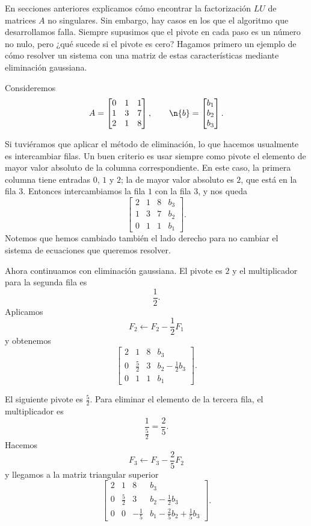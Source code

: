 En secciones anteriores explicamos cómo encontrar la factorización $LU$ de matrices $A$ no singulares. Sin embargo, hay casos en los que el algoritmo que desarrollamos falla. Siempre supusimos que el pivote en cada paso es un número no nulo, pero ¿qué sucede si el pivote es cero? Hagamos primero un ejemplo de cómo resolver un sistema con una matriz de estas características mediante eliminación gaussiana.

Consideremos
\[
A = \begin{bmatrix}
0 & 1 & 1 \\
1 & 3 & 7 \\
2 & 1 & 8
\end{bmatrix}, \qquad
\n{b} = \begin{bmatrix} b_1 \\ b_2 \\ b_3 \end{bmatrix}.
\]

Si tuviéramos que aplicar el método de eliminación, lo que hacemos usualmente es intercambiar filas. Un buen criterio es usar siempre como pivote el elemento de mayor valor absoluto de la columna correspondiente. En este caso, la primera columna tiene entradas $0$, $1$ y $2$; la de mayor valor absoluto es $2$, que está en la fila $3$. Entonces intercambiamos la fila $1$ con la fila $3$, y nos queda
\[
\left[\begin{array}{ccc|c}
2 & 1 & 8 & b_3 \\
1 & 3 & 7 & b_2 \\
0 & 1 & 1 & b_1
\end{array}\right].
\]
Notemos que hemos cambiado también el lado derecho para no cambiar el sistema de ecuaciones que queremos resolver.

Ahora continuamos con eliminación gaussiana. El pivote es $2$ y el multiplicador para la segunda fila es
\[
\frac{1}{2}.
\]
Aplicamos
\[
F_2 \leftarrow F_2 - \frac{1}{2}F_1
\]
y obtenemos
\[
\left[\begin{array}{ccc|c}
2 & 1 & 8 & b_3 \\
0 & \frac{5}{2} & 3 & b_2 - \frac{1}{2}b_3 \\
0 & 1 & 1 & b_1
\end{array}\right].
\]

El siguiente pivote es $\frac{5}{2}$. Para eliminar el elemento de la tercera fila, el multiplicador es
\[
\frac{1}{\frac{5}{2}} = \frac{2}{5}.
\]
Hacemos
\[
F_3 \leftarrow F_3 - \frac{2}{5}F_2
\]
y llegamos a la matriz triangular superior
\[
\left[\begin{array}{ccc|c}
2 & 1 & 8 & b_3 \\
0 & \frac{5}{2} & 3 & b_2 - \frac{1}{2}b_3 \\
0 & 0 & -\frac{1}{5} & b_1 - \frac{2}{5}b_2 + \frac{1}{5}b_3
\end{array}\right].
\]

